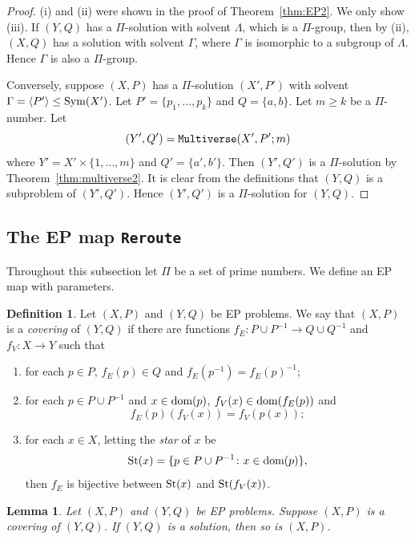 \documentclass[10pt,a4paper]{amsart}
\newtheorem{lemma}[theorem]{Lemma}
\theoremstyle{definition}
\newtheorem{definition}[theorem]{Definition}
\newcommand{\dom}{{\mbox{\rm dom}}}
\theoremstyle{definition}
\numberwithin{equation}{section}
\begin{document}
\begin{proof} (i) and (ii) were shown in the proof of Theorem~\ref{thm:EP2}. We only show (iii). If $(Y, Q)$ has a $\Pi$-solution with solvent $\Lambda$, which is a $\Pi$-group, then by (ii), $(X, Q)$ has a solution with solvent $\Gamma$, where $\Gamma$ is isomorphic to a subgroup of $\Lambda$. Hence $\Gamma$ is also a $\Pi$-group. 

Conversely, suppose $(X, P)$ has a $\Pi$-solution $(X', P')$ with solvent $\Gamma=\langle P'\rangle\leq \mbox{\rm Sym}(X')$. Let $P'=\{p_1,\dots, p_k\}$ and $Q=\{a, b\}$. Let $m\geq k$ be a $\Pi$-number. Let 
$$ (Y',Q')={\tt Multiverse}(X', P'; m) $$
where $Y'=X'\times\{1,\dots, m\}$ and $Q'=\{a',b'\}$. Then $(Y', Q')$ is a $\Pi$-solution by Theorem~\ref{thm:multiverse2}. It is clear from the definitions that $(Y, Q)$ is a subproblem of $(Y', Q')$. Hence $(Y', Q')$ is a $\Pi$-solution for $(Y, Q)$.
\end{proof}











\subsection{The EP map {\tt Reroute}} Throughout this subsection let $\Pi$ be a set of prime numbers. We define an EP map with parameters.


\begin{definition}\label{def:covering} Let $(X, P)$ and $(Y, Q)$ be EP problems. We say that $(X, P)$ is a {\em covering} of $(Y, Q)$ if there are functions $f_E\colon P\cup P^{-1}\to Q\cup Q^{-1}$ and $f_V\colon X\to Y$ such that 
\begin{enumerate}
\item[(i)] for each $p\in P$, $f_E(p)\in Q$ and $f_E(p^{-1})=f_E(p)^{-1}$;
\item[(ii)] for each $p\in P\cup P^{-1}$ and $x\in \dom(p)$, $f_V(x)\in \dom(f_E(p))$ and 
$$f_E(p)(f_V(x))=f_V(p(x));$$
\item[(iii)] for each $x\in X$, letting the {\em star} of $x$ be 
$$\mbox{\rm St}(x)=\{p\in P\cup P^{-1}\colon x\in\dom(p)\},$$ then $f_E$ is bijective between $\mbox{\rm St}(x)$ and $\mbox{\rm St}(f_V(x))$.
\end{enumerate}
\end{definition}

\begin{lemma}\label{lem:cov} Let $(X, P)$ and $(Y, Q)$ be EP problems. Suppose $(X, P)$ is a covering of $(Y,Q)$. If $(Y,Q)$ is a solution, then so is $(X, P)$.
\end{lemma}
\end{document}
